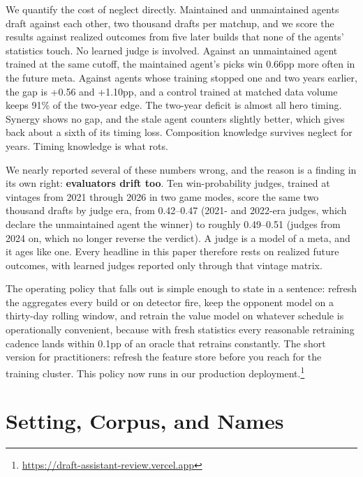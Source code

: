 \documentclass[journal]{IEEEtran}
\newcommand{\deployurl}{\url{https://draft-assistant-review.vercel.app}}
\newcommand{\deployurl}{\url{https://www.hotsfever.com}}
\begin{document}
We quantify the cost of neglect directly. Maintained and unmaintained
agents draft against each other, two thousand drafts per matchup, and we
score the results against realized outcomes from five later builds that
none of the agents' statistics touch. No learned judge is involved.
Against an unmaintained agent trained at the same cutoff, the maintained
agent's picks win 0.66pp more often in the future meta. Against agents
whose training stopped one and two years earlier, the gap is +0.56 and
+1.10pp, and a control trained at matched data volume keeps 91\% of the
two-year edge. The two-year deficit is almost all hero timing. Synergy
shows no gap, and the stale agent counters slightly better, which gives
back about a sixth of its timing loss. Composition knowledge survives
neglect for years. Timing knowledge is what rots.

We nearly reported several of these numbers wrong, and the reason is a
finding in its own right: \textbf{evaluators drift too}. Ten
win-probability judges, trained at vintages from 2021 through 2026 in
two game modes, score the same two thousand drafts by judge era, from
0.42--0.47 (2021- and 2022-era judges, which declare the unmaintained
agent the winner) to roughly 0.49--0.51 (judges from 2024 on, which no
longer reverse the verdict). A judge is a model of a meta, and it ages like
one. Every headline in this paper therefore rests on realized future
outcomes, with learned judges reported only through that vintage matrix.

The operating policy that falls out is simple enough to state in a
sentence: refresh the aggregates every build or on detector fire, keep
the opponent model on a thirty-day rolling window, and retrain the value
model on whatever schedule is operationally convenient, because with
fresh statistics every reasonable retraining cadence lands within 0.1pp
of an oracle that retrains constantly. The short version for
practitioners: refresh the feature store before you reach for the
training cluster. This policy now runs in our production
deployment.\footnote{\deployurl}

\section{Setting, Corpus, and Names}
\label{sec:setting}
\end{document}

